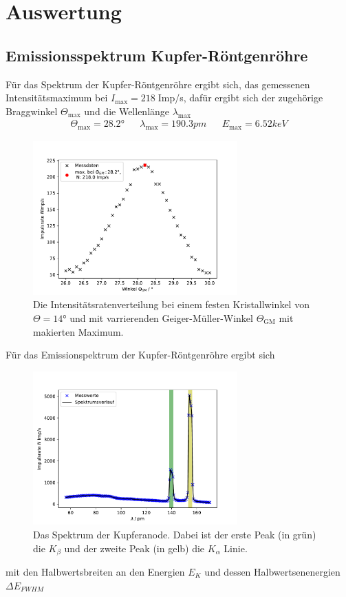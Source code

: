 \newpage
\section{Auswertung}
\subsection{Emissionsspektrum Kupfer-Röntgenröhre}
Für das Spektrum der Kupfer-Röntgenröhre ergibt sich, das gemessenen
Intensitätsmaximum bei $I_{\text{max}}=218\;$Imp/s, dafür ergibt sich
der zugehörige Braggwinkel $\Theta_{\text{max}}$ und die Wellenlänge $\lambda_{\text{max}}$
\begin{align*}
    \Theta_{\text{max}}=28.2° && \lambda_{\text{max}}=190.3\si{pm}&&E_{\text{max}}=6.52\si{keV}
\end{align*}
\begin{figure}[H]
    \centering
    \includegraphics[width=0.7\textwidth]{plots/messdaten1.pdf}
    \caption{Die Intensitätsratenverteilung bei einem festen Kristallwinkel
    von $\Theta=14$° und mit varrierenden Geiger-Müller-Winkel $\Theta_{\text{GM}}$ mit makierten Maximum.}
    \label{fig:spektrums}
\end{figure}
Für das Emissionspektrum der Kupfer-Röntgenröhre ergibt sich
\begin{figure}[H]
    \centering
    \includegraphics[width=0.7\textwidth]{plots/spektrum.pdf}
    \caption{Das Spektrum der Kupferanode. Dabei ist der erste Peak (in grün)
    die $K_{\beta}$ und der zweite Peak (in gelb) die $K_{\alpha}$ 
    Linie.}
    \label{fig:peaks}
\end{figure}
mit den Halbwertsbreiten an den Energien $E_K$ und dessen Halbwertsenenergien $\Delta E_{FWHM}$

